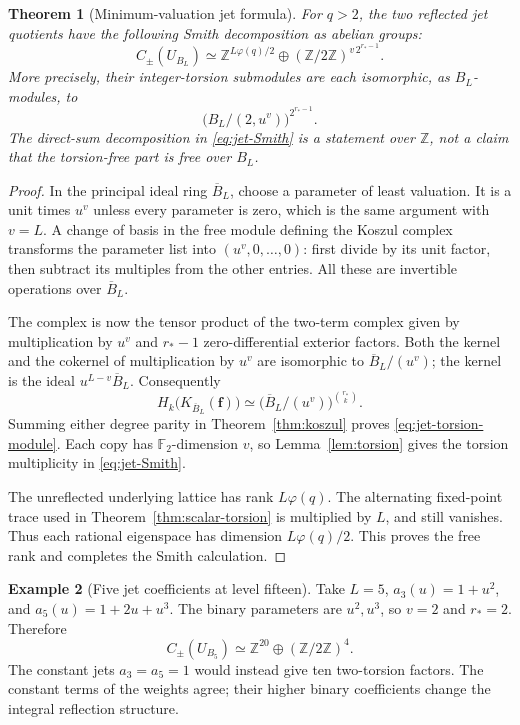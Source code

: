 \documentclass[11pt]{article}
\numberwithin{equation}{section}
\newtheorem{theorem}{Theorem}[section]
\theoremstyle{definition}
\newtheorem{example}[theorem]{Example}
\theoremstyle{remark}
\newcommand{\Z}{\mathbb Z}
\newcommand{\F}{\mathbb{F}_2}
\begin{document}
\begin{theorem}[Minimum-valuation jet formula]
\label{thm:jets}
For $q>2$, the two reflected jet quotients have the following Smith
decomposition as abelian groups:
\begin{equation}
 C_\pm(U_{B_L})\simeq
 \Z^{L\varphi(q)/2}\oplus(\Z/2\Z)^{v\,2^{r_*-1}}.
 \label{eq:jet-Smith}
\end{equation}
More precisely, their integer-torsion submodules are each isomorphic,
as $B_L$-modules, to
\begin{equation}
 \bigl(B_L/(2,u^v)\bigr)^{2^{r_*-1}}.
 \label{eq:jet-torsion-module}
\end{equation}
The direct-sum decomposition in \eqref{eq:jet-Smith} is a statement over
$\Z$, not a claim that the torsion-free part is free over $B_L$.
\end{theorem}
\begin{proof}
In the principal ideal ring $\overline B_L$, choose a parameter of least
valuation. It is a unit times $u^v$ unless every parameter is zero,
which is the same argument with $v=L$. A change of basis in the free
module defining the Koszul complex transforms the parameter list into
$(u^v,0,\ldots,0)$: first divide by its unit factor, then subtract its
multiples from the other entries. All these are invertible operations
over $\overline B_L$.

The complex is now the tensor product of the two-term complex given by
multiplication by $u^v$ and $r_*-1$ zero-differential exterior factors.
Both the kernel and the cokernel of multiplication by $u^v$ are
isomorphic to $\overline B_L/(u^v)$; the kernel is the ideal
$u^{L-v}\overline B_L$. Consequently
\[
 H_k\bigl(K_{\overline B_L}(\boldsymbol f)\bigr)
 \simeq\bigl(\overline B_L/(u^v)\bigr)^{\binom{r_*}{k}}.
\]
Summing either degree parity in Theorem~\ref{thm:koszul} proves
\eqref{eq:jet-torsion-module}. Each copy has $\F$-dimension $v$,
so Lemma~\ref{lem:torsion} gives the torsion multiplicity in
\eqref{eq:jet-Smith}.

The unreflected underlying lattice has rank $L\varphi(q)$.
The alternating fixed-point trace used in
Theorem~\ref{thm:scalar-torsion} is multiplied by $L$, and still
vanishes. Thus each rational eigenspace has dimension
$L\varphi(q)/2$. This proves the free rank and completes the Smith
calculation.
\end{proof}

\begin{example}[Five jet coefficients at level fifteen]
Take $L=5$, $a_3(u)=1+u^2$, and $a_5(u)=1+2u+u^3$.
The binary parameters are $u^2,u^3$, so $v=2$ and $r_*=2$. Therefore
\[
 C_\pm(U_{B_5})\simeq\Z^{20}\oplus(\Z/2\Z)^4.
\]
The constant jets $a_3=a_5=1$ would instead give ten two-torsion factors.
The constant terms of the weights agree; their higher binary
coefficients change the integral reflection structure.
\end{example}
\end{document}
